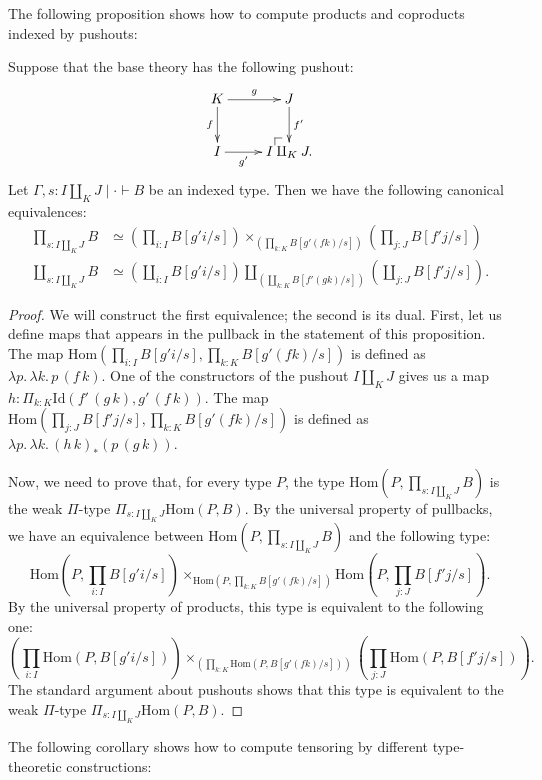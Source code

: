 \documentclass[reqno]{amsart}
\makeatletter
\theoremstyle{definition}
\theoremstyle{remark}
\newcommand{\ob}{}
\newcommand{\fs}[1]{\mathrm{#1}}
\newcommand{\Hom}{\fs{Hom}}
\newcommand{\Id}{\fs{Id}}
\numberwithin{figure}{section}
\newcommand{\po}[1][dr]{\save*!/#1+1.2pc/#1:(1,-1)@^{|-}\restore}
\makeatother
\begin{document}
The following proposition shows how to compute products and coproducts indexed by pushouts:

\begin{prop}
Suppose that the base theory has the following pushout:
\[ \xymatrix{ K \ar[r]^-g \ar[d]_-f & J \ar[d]^-{f'} \\
              I \ar[r]_-{g'}        & \po I \amalg_K J.
            } \]
Let $\Gamma, s : I \amalg_K J \mid \cdot \vdash B \ob$ be an indexed type.
Then we have the following canonical equivalences:
\begin{align*}
\prod_{s : I \amalg_K J} B & \simeq (\prod_{i : I} B[g' i/s]) \times_{(\prod_{k : K} B[g' (f k) / s])} (\prod_{j : J} B[f' j/s]) \\
\coprod_{s : I \amalg_K J} B & \simeq (\coprod_{i : I} B[g' i/s]) \amalg_{(\coprod_{k : K} B[f' (g k) / s])} (\coprod_{j : J} B[f' j/s]).
\end{align*}
\end{prop}
\begin{proof}
We will construct the first equivalence; the second is its dual.
First, let us define maps that appears in the pullback in the statement of this proposition.
The map $\Hom(\prod_{i : I} B[g' i/s], \prod_{k : K} B[g' (f k) / s])$ is defined as $\lambda p.\,\lambda k.\,p\,(f\,k)$.
One of the constructors of the pushout $I \amalg_K J$ gives us a map $h : \Pi_{k : K} \Id(f'\,(g\,k),g'\,(f\,k))$.
The map $\Hom(\prod_{j : J} B[f' j/s], \prod_{k : K} B[g' (f k) / s])$ is defined as $\lambda p.\,\lambda k.\,(h\,k)_*(p\,(g\,k))$.

Now, we need to prove that, for every type $P$, the type $\Hom(P, \prod_{s : I \amalg_K J} B)$ is the weak $\Pi$-type $\Pi_{s : I \amalg_K J} \Hom(P,B)$.
By the universal property of pullbacks, we have an equivalence between $\Hom(P, \prod_{s : I \amalg_K J} B)$ and the following type:
\[ \Hom(P, \prod_{i : I} B[g' i/s]) \times_{\Hom(P, \prod_{k : K} B[g' (f k) / s])} \Hom(P, \prod_{j : J} B[f' j/s]). \]
By the universal property of products, this type is equivalent to the following one:
\[ (\prod_{i : I} \Hom(P, B[g' i/s])) \times_{(\prod_{k : K} \Hom(P, B[g' (f k) / s]))} (\prod_{j : J} \Hom(P, B[f' j/s])). \]
The standard argument about pushouts shows that this type is equivalent to the weak $\Pi$-type $\Pi_{s : I \amalg_K J} \Hom(P,B)$.
\end{proof}

The following corollary shows how to compute tensoring by different type-theoretic constructions:
\end{document}
